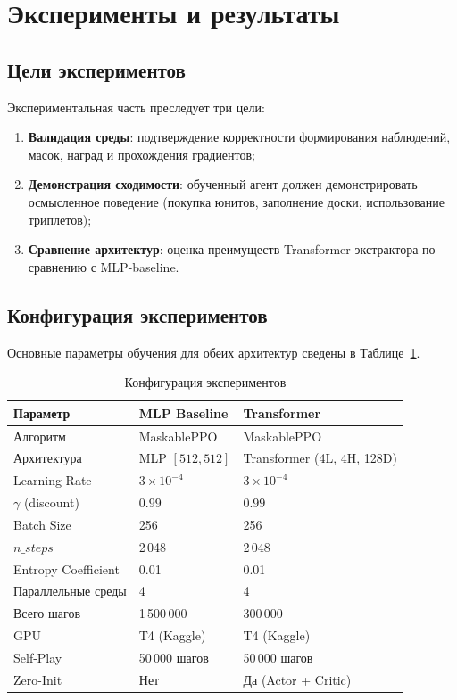 \documentclass[a4paper,12pt]{extarticle}
\begin{document}
\newpage

\section{Эксперименты и результаты}

\subsection{Цели экспериментов}

Экспериментальная часть преследует три цели:
\begin{enumerate}[noitemsep]
  \item \textbf{Валидация среды}: подтверждение корректности формирования наблюдений, масок, наград и прохождения градиентов;
  \item \textbf{Демонстрация сходимости}: обученный агент должен демонстрировать осмысленное поведение (покупка юнитов, заполнение доски, использование триплетов);
  \item \textbf{Сравнение архитектур}: оценка преимуществ Transformer-экстрактора по сравнению с MLP-baseline.
\end{enumerate}

\subsection{Конфигурация экспериментов}

Основные параметры обучения для обеих архитектур сведены в Таблице~\ref{tab:experiment_config}.

\begin{longtable}{p{5.5cm}p{4cm}p{4cm}}
\caption{Конфигурация экспериментов}\label{tab:experiment_config}\\
\toprule
\textbf{Параметр} & \textbf{MLP Baseline} & \textbf{Transformer} \\
\midrule
Алгоритм & MaskablePPO & MaskablePPO \\
Архитектура & MLP $[512, 512]$ & Transformer (4L, 4H, 128D) \\
Learning Rate & $3 \times 10^{-4}$ & $3 \times 10^{-4}$ \\
$\gamma$ (discount) & $0.99$ & $0.99$ \\
Batch Size & 256 & 256 \\
$n\_steps$ & 2\,048 & 2\,048 \\
Entropy Coefficient & 0.01 & 0.01 \\
Параллельные среды & 4 & 4 \\
Всего шагов & 1\,500\,000 & 300\,000 \\
GPU & T4 (Kaggle) & T4 (Kaggle) \\
Self-Play & 50\,000 шагов & 50\,000 шагов \\
Zero-Init & Нет & Да (Actor + Critic) \\
\bottomrule
\end{longtable}
\end{document}
